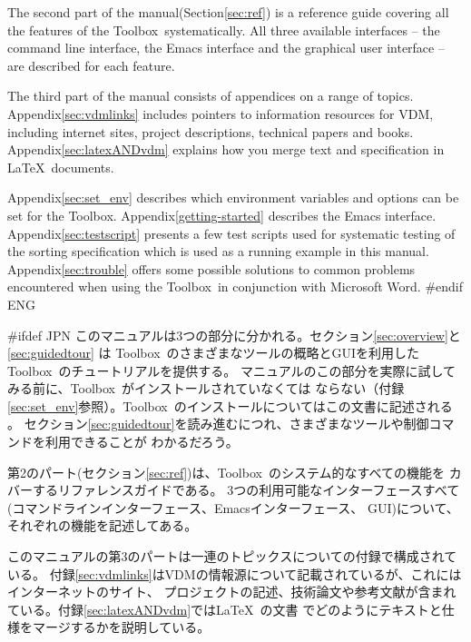 \documentclass[\pformat,12pt]{article}
\newcommand{\Toolbox}{Toolbox}
\newcommand{\Toolbox}{Toolbox}
\begin{document}
The second part of the manual(Section\ref{sec:ref}) is a reference
guide covering all the features of the \Toolbox\ systematically. All three
available interfaces -- the command line interface, the Emacs interface
and the graphical user interface -- are described for each feature.

The third part of the manual consists of appendices on a range of
topics. 
 Appendix\ref{sec:vdmlinks} includes
pointers to information resources for VDM, including internet sites,
project descriptions, technical papers and books.
Appendix\ref{sec:latexANDvdm} explains how you merge text and
specification in \LaTeX\ documents.

Appendix\ref{sec:set_env} describes which environment
variables and options can be set for the \Toolbox.
Appendix\ref{getting-started} describes the Emacs interface.
Appendix\ref{sec:testscript} presents a few test scripts used for
systematic testing of the sorting specification which is used as a
running example in this manual.  
Appendix\ref{sec:trouble} offers some possible solutions 
to common problems encountered when using the \Toolbox\ in conjunction
with Microsoft Word.  
#endif ENG

#ifdef JPN
このマニュアルは3つの部分に分かれる。セクション\ref{sec:overview}と\ref{sec:guidedtour} は
\Toolbox\ のさまざまなツールの概略とGUIを利用した\Toolbox\ のチュートリアルを提供する。
マニュアルのこの部分を実際に試してみる前に、\Toolbox\ がインストールされていなくては
ならない（付録\ref{sec:set_env}参照）。\Toolbox\ のインストールについてはこの文書に記述される
。
セクション\ref{sec:guidedtour}を読み進むにつれ、さまざまなツールや制御コマンドを利用できることが
わかるだろう。

第2のパート(セクション\ref{sec:ref})は、\Toolbox\ のシステム的なすべての機能を
カバーするリファレンスガイドである。
3つの利用可能なインターフェースすべて(コマンドラインインターフェース、Emacsインターフェース、
GUI)について、それぞれの機能を記述してある。

このマニュアルの第3のパートは一連のトピックスについての付録で構成されている。
付録\ref{sec:vdmlinks}はVDMの情報源について記載されているが、これにはインターネットのサイト、
プロジェクトの記述、技術論文や参考文献が含まれている。付録\ref{sec:latexANDvdm}では\LaTeX\ の文書
でどのようにテキストと仕様をマージするかを説明している。
\end{document}

